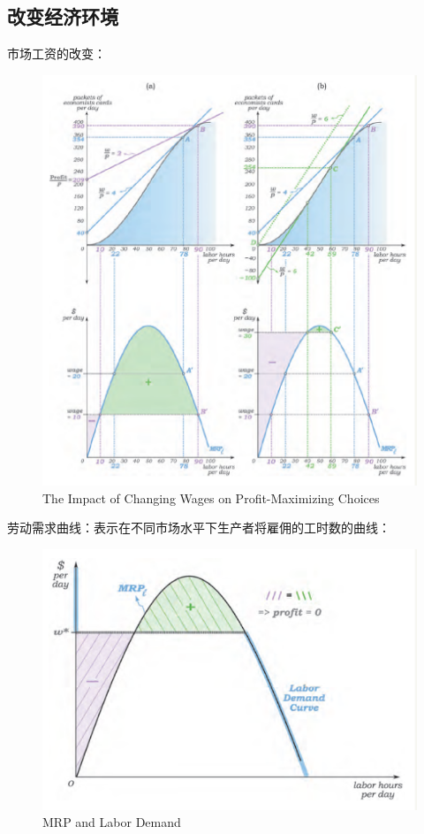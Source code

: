 \documentclass{article}
\begin{document}
\subsection{改变经济环境}
市场工资的改变：
\begin{figure}[H] %
	\centering %
	\includegraphics[width=1\textwidth]{11_4} %
	\caption{The Impact of Changing Wages on Profit-Maximizing Choices} %
	\label{Fig.main5} %
\end{figure}

劳动需求曲线：表示在不同市场水平下生产者将雇佣的工时数的曲线：

\begin{figure}[H] %
	\centering %
	\includegraphics[width=1\textwidth]{11_5} %
	\caption{MRP and Labor Demand} %
	\label{Fig.main6} %
\end{figure}
\end{document}
